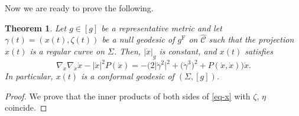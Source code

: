 \documentclass[pdftex]{sigma}
\newcommand{\wh}{\widehat}
\numberwithin{equation}{section}
\newtheorem{Theorem}{Theorem}[section]
\begin{document}
Now we are ready to prove the following.

\begin{Theorem}\label{null-geod-proj}
Let $g\in[g]$ be a representative metric and let $\gamma(t)=(x(t), \zeta(t))$ be a null geodesic of $g^{\mathrm{F}}$ on $\wh{\mathcal{C}}$ such that the projection $x(t)$ is a regular curve on $\Sigma$. Then, $|\dot x|_g$ is constant, and $x(t)$ satisfies
\begin{equation}\label{eq-x}
\nabla_{\dot x}\nabla_{\dot x}\dot x-|\dot x|^2P(\dot x)=
-\bigl(2\bigl|\dot\gamma^2\bigr|^2+\bigl(\dot\gamma^3\bigr)^2+P(\dot x, \dot x)\bigr)\dot x.
\end{equation}
In particular, $x(t)$ is a conformal geodesic of $(\Sigma, [g])$.
\end{Theorem}
\begin{proof}
We prove that the inner products of both sides of \eqref{eq-x} with $\zeta$, $\eta$ coincide.


\end{proof}
\end{document}
